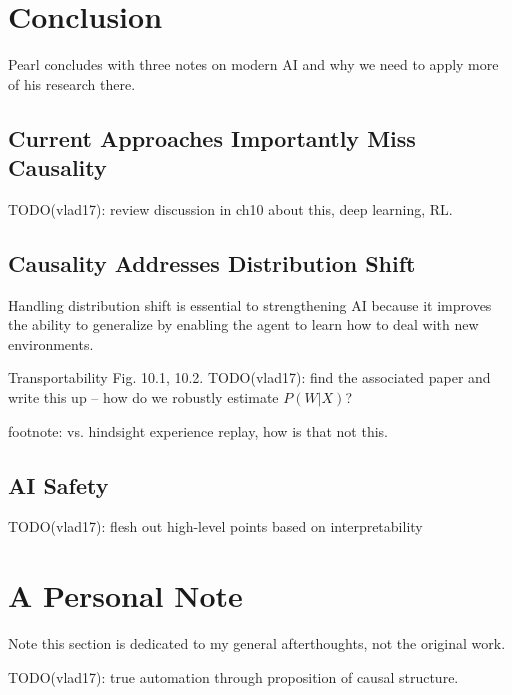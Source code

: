 \documentclass{article}
\begin{document}
\section{Conclusion}

Pearl concludes with three notes on modern AI and why we need to apply more of his research there.

\subsection{Current Approaches Importantly Miss Causality}

TODO(vlad17): review discussion in ch10 about this, deep learning, RL.

\subsection{Causality Addresses Distribution Shift}

Handling distribution shift is essential to strengthening AI because it improves the ability to generalize by enabling the agent to learn how to deal with new environments.

Transportability Fig. 10.1, 10.2. TODO(vlad17): find the associated paper and write this up -- how do we robustly estimate $P(W|X)$?


footnote: vs. hindsight experience replay, how is that not this.

\subsection{AI Safety}

TODO(vlad17): flesh out high-level points based on interpretability

\section*{A Personal Note}

Note this section is dedicated to my general afterthoughts, not the original work.

TODO(vlad17): true automation through proposition of causal structure.
\end{document}
